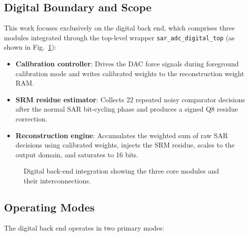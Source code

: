 \documentclass[journal]{IEEEtran}
\begin{document}
\subsection{Digital Boundary and Scope}

This work focuses exclusively on the digital back end, which comprises three
modules integrated through the top-level wrapper \texttt{sar\_adc\_digital\_top}
(as shown in Fig.~\ref{fig:digital_top}):

\begin{itemize}
    \item \textbf{Calibration controller}: Drives the DAC force signals during
          foreground calibration mode and writes calibrated weights to the
          reconstruction weight RAM.
    \item \textbf{SRM residue estimator}: Collects 22 repeated noisy comparator
          decisions after the normal SAR bit-cycling phase and produces a signed
          Q8 residue correction.
    \item \textbf{Reconstruction engine}: Accumulates the weighted sum of raw
          SAR decisions using calibrated weights, injects the SRM residue,
          scales to the output domain, and saturates to 16 bits.
\end{itemize}

\begin{figure}[!t]
\centering
{}
\caption{Digital back-end integration showing the three core modules and their
interconnections.}
\label{fig:digital_top}
\end{figure}

\subsection{Operating Modes}

The digital back end operates in two primary modes:
\end{document}
